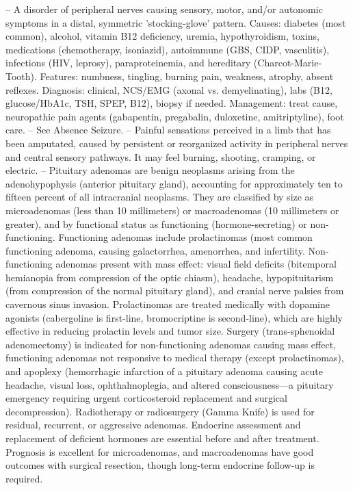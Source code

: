 -- A disorder of peripheral nerves causing sensory, motor, and/or autonomic symptoms in a distal, symmetric 'stocking-glove' pattern. Causes: diabetes (most common), alcohol, vitamin B12 deficiency, uremia, hypothyroidism, toxins, medications (chemotherapy, isoniazid), autoimmune (GBS, CIDP, vasculitis), infections (HIV, leprosy), paraproteinemia, and hereditary (Charcot-Marie-Tooth). Features: numbness, tingling, burning pain, weakness, atrophy, absent reflexes. Diagnosis: clinical, NCS/EMG (axonal vs. demyelinating), labs (B12, glucose/HbA1c, TSH, SPEP, B12), biopsy if needed. Management: treat cause, neuropathic pain agents (gabapentin, pregabalin, duloxetine, amitriptyline), foot care.
-- See Absence Seizure.
-- Painful sensations perceived in a limb that has been amputated, caused by persistent or reorganized activity in peripheral nerves and central sensory pathways. It may feel burning, shooting, cramping, or electric.
-- Pituitary adenomas are benign neoplasms arising from the adenohypophysis (anterior pituitary gland), accounting for approximately ten to fifteen percent of all intracranial neoplasms. They are classified by size as microadenomas (less than 10 millimeters) or macroadenomas (10 millimeters or greater), and by functional status as functioning (hormone-secreting) or non-functioning. Functioning adenomas include prolactinomas (most common functioning adenoma, causing galactorrhea, amenorrhea, and infertility. Non-functioning adenomas present with mass effect: visual field deficits (bitemporal hemianopia from compression of the optic chiasm), headache, hypopituitarism (from compression of the normal pituitary gland), and cranial nerve palsies from cavernous sinus invasion. Prolactinomas are treated medically with dopamine agonists (cabergoline is first-line, bromocriptine is second-line), which are highly effective in reducing prolactin levels and tumor size. Surgery (trans-sphenoidal adenomectomy) is indicated for non-functioning adenomas causing mass effect, functioning adenomas not responsive to medical therapy (except prolactinomas), and apoplexy (hemorrhagic infarction of a pituitary adenoma causing acute headache, visual loss, ophthalmoplegia, and altered consciousness—a pituitary emergency requiring urgent corticosteroid replacement and surgical decompression). Radiotherapy or radiosurgery (Gamma Knife) is used for residual, recurrent, or aggressive adenomas. Endocrine assessment and replacement of deficient hormones are essential before and after treatment. Prognosis is excellent for microadenomas, and macroadenomas have good outcomes with surgical resection, though long-term endocrine follow-up is required.
